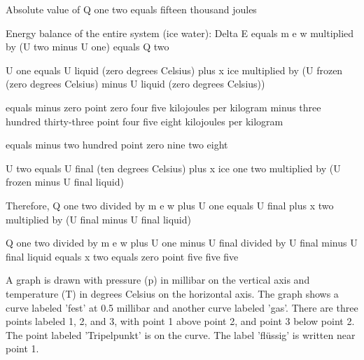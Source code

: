Absolute value of Q one two equals fifteen thousand joules  

Energy balance of the entire system (ice water):  
Delta E equals m e w multiplied by (U two minus U one) equals Q two  

U one equals U liquid (zero degrees Celsius) plus x ice multiplied by (U frozen (zero degrees Celsius) minus U liquid (zero degrees Celsius))  

equals minus zero point zero four five kilojoules per kilogram minus three hundred thirty-three point four five eight kilojoules per kilogram  

equals minus two hundred point zero nine two eight  

U two equals U final (ten degrees Celsius) plus x ice one two multiplied by (U frozen minus U final liquid)  

Therefore, Q one two divided by m e w plus U one equals U final plus x two multiplied by (U final minus U final liquid)  

Q one two divided by m e w plus U one minus U final divided by U final minus U final liquid equals x two equals zero point five five five

A graph is drawn with pressure (p) in millibar on the vertical axis and temperature (T) in degrees Celsius on the horizontal axis. The graph shows a curve labeled 'fest' at 0.5 millibar and another curve labeled 'gas'. There are three points labeled 1, 2, and 3, with point 1 above point 2, and point 3 below point 2. The point labeled 'Tripelpunkt' is on the curve. The label 'flüssig' is written near point 1.
